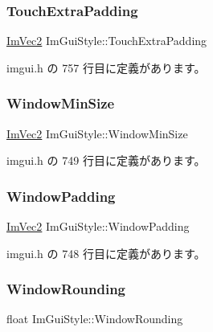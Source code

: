\subsubsection{\texorpdfstring{Touch\+Extra\+Padding}{TouchExtraPadding}}
{\footnotesize\ttfamily \mbox{\hyperlink{struct_im_vec2}{Im\+Vec2}} Im\+Gui\+Style\+::\+Touch\+Extra\+Padding}



 imgui.\+h の 757 行目に定義があります。

\mbox{\label{struct_im_gui_style_a060b2f743a086d0f0fee4cd5b3f372d4}} 
\subsubsection{\texorpdfstring{Window\+Min\+Size}{WindowMinSize}}
{\footnotesize\ttfamily \mbox{\hyperlink{struct_im_vec2}{Im\+Vec2}} Im\+Gui\+Style\+::\+Window\+Min\+Size}



 imgui.\+h の 749 行目に定義があります。

\mbox{\label{struct_im_gui_style_a37f156b53e6dcc99ff57366ceafe8b50}} 
\subsubsection{\texorpdfstring{Window\+Padding}{WindowPadding}}
{\footnotesize\ttfamily \mbox{\hyperlink{struct_im_vec2}{Im\+Vec2}} Im\+Gui\+Style\+::\+Window\+Padding}



 imgui.\+h の 748 行目に定義があります。

\mbox{\label{struct_im_gui_style_acd902c2ab4b53d4bb0f64da608320894}} 
\subsubsection{\texorpdfstring{Window\+Rounding}{WindowRounding}}
{\footnotesize\ttfamily float Im\+Gui\+Style\+::\+Window\+Rounding}



